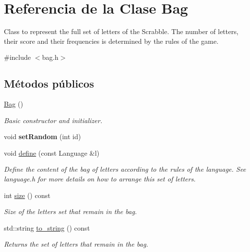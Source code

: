 \hypertarget{classBag}{}\section{Referencia de la Clase Bag}
\label{classBag}


Class to represent the full set of letters of the Scrabble. The number of letters, their score and their frequencies is determined by the rules of the game.  




{\ttfamily \#include $<$bag.\+h$>$}

\subsection*{Métodos públicos}
\begin{DoxyCompactItemize}
\item 
\mbox{\label{classBag_ae0593c22c7dd8b32cab469af92fb200c}} 
\hyperlink{classBag_ae0593c22c7dd8b32cab469af92fb200c}{Bag} ()
\begin{DoxyCompactList}\small\item\em Basic constructor and initializer. \end{DoxyCompactList}\item 
\mbox{\label{classBag_a749e428f99881d5fa88978a471b13cb7}} 
void {\bfseries set\+Random} (int id)
\item 
void \hyperlink{classBag_ad380d36f2628b3ffe0ca19cfe53d7c19}{define} (const Language \&l)
\begin{DoxyCompactList}\small\item\em Define the content of the bag of letters according to the rules of the language. See language.\+h for more details on how to arrange this set of letters. \end{DoxyCompactList}\item 
int \hyperlink{classBag_a32652be363a0f5d189b029ed863e5bf2}{size} () const
\begin{DoxyCompactList}\small\item\em Size of the letters set that remain in the bag. \end{DoxyCompactList}\item 
std\+::string \hyperlink{classBag_ac63bdc8c3ceed6d86db66b9d399764ab}{to\+\_\+string} () const
\begin{DoxyCompactList}\small\item\em Returns the set of letters that remain in the bag. \end{DoxyCompactList}\item 

\end{DoxyCompactItemize}
